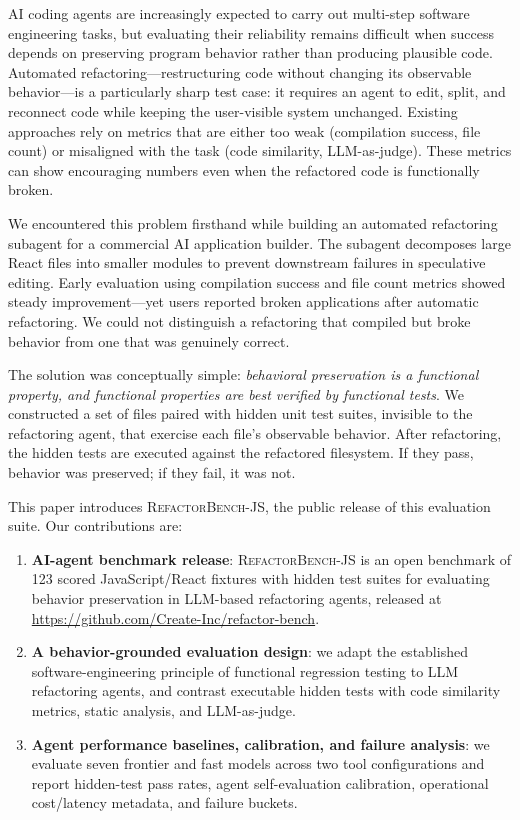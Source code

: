 \documentclass[11pt,letterpaper]{article}
\begin{document}
AI coding agents are increasingly expected to carry out multi-step software engineering tasks, but evaluating their reliability remains difficult when success depends on preserving program behavior rather than producing plausible code. Automated refactoring---restructuring code without changing its observable behavior---is a particularly sharp test case: it requires an agent to edit, split, and reconnect code while keeping the user-visible system unchanged. Existing approaches rely on metrics that are either too weak (compilation success, file count) or misaligned with the task (code similarity, LLM-as-judge). These metrics can show encouraging numbers even when the refactored code is functionally broken.

We encountered this problem firsthand while building an automated refactoring subagent for a commercial AI application builder. The subagent decomposes large React files into smaller modules to prevent downstream failures in speculative editing. Early evaluation using compilation success and file count metrics showed steady improvement---yet users reported broken applications after automatic refactoring. We could not distinguish a refactoring that compiled but broke behavior from one that was genuinely correct.

The solution was conceptually simple: \emph{behavioral preservation is a functional property, and functional properties are best verified by functional tests}. We constructed a set of files paired with hidden unit test suites, invisible to the refactoring agent, that exercise each file's observable behavior. After refactoring, the hidden tests are executed against the refactored filesystem. If they pass, behavior was preserved; if they fail, it was not.

This paper introduces \textsc{RefactorBench}-JS, the public release of this evaluation suite. Our contributions are:

\begin{enumerate}[leftmargin=2em]
\item \textbf{AI-agent benchmark release}: \textsc{RefactorBench}-JS is an open benchmark of 123 scored JavaScript/React fixtures with hidden test suites for evaluating behavior preservation in LLM-based refactoring agents, released at \url{https://github.com/Create-Inc/refactor-bench}.

\item \textbf{A behavior-grounded evaluation design}: we adapt the established software-engineering principle of functional regression testing to LLM refactoring agents, and contrast executable hidden tests with code similarity metrics, static analysis, and LLM-as-judge.

\item \textbf{Agent performance baselines, calibration, and failure analysis}: we evaluate seven frontier and fast models across two tool configurations and report hidden-test pass rates, agent self-evaluation calibration, operational cost/latency metadata, and failure buckets.
\end{enumerate}
\end{document}
